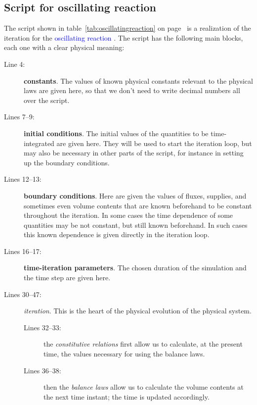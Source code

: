 \documentclass[a4paper,12pt,%
onecolumn,oneside,%
british%
]{memoir}
\renewcommand*{\|}[1][]{\nonscript\:#1\vert\nonscript\:\mathopen{}}
\newcommand*{\sect}{\S}%
\renewcommand*{\autoref}[3][\sect\,\ref]{\textcolor{blue}{#3}
\raisebox{0.6ex}{\color{blue}\miniscule%
\faIcon{angle-right}%
\;#1{#2}\;p.\,\pageref{#2}}}
\begin{document}
\subsection{Script for oscillating reaction}

The script shown in table~\ref{tab:oscillatingreaction} on page~\pageref{tab:oscillatingreaction} is a realization of the iteration for the \autoref{sec:oscillatingreact2}{oscillating reaction}. The script has the following main blocks, each one with a clear physical meaning:
\begin{description}
\item[Line 4:] \textbf{constants}. The values of known physical constants relevant to the physical laws are given here, so that we don't need to write decimal numbers all over the script.

\item[Lines 7--9:] \textbf{initial conditions}. The initial values of the quantities to be time-integrated are given here. They will be used to start the iteration loop, but may also be necessary in other parts of the script, for instance in setting up the boundary conditions.

\item[Lines 12--13:] \textbf{boundary conditions}. Here are given the values of fluxes, supplies, and sometimes even volume contents that are known beforehand to be constant throughout the iteration. In some cases the time dependence of some quantities may be not constant, but still known beforehand. In such cases this known dependence is given directly in the iteration loop.

\item[Lines 16--17:] \textbf{time-iteration parameters}. The chosen duration of the simulation and the time step are given here.

\item[Lines 30--47:] \emph{iteration}. This is the heart of the physical evolution of the physical system.
  \begin{description}
  \item[Lines 32--33:] the \emph{constitutive relations} first allow us to calculate, at the present time, the values necessary for using the balance laws.
  \item[Lines 36--38:] then the \emph{balance laws} allow us to calculate the volume contents at the next time instant; the time is updated accordingly.
  \end{description}
\end{description}
\end{document}
